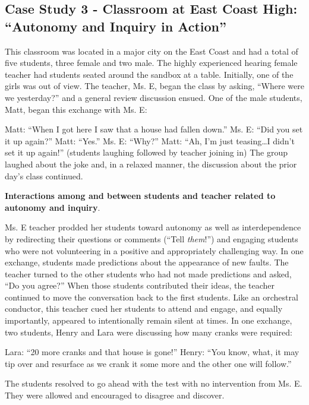 \documentclass[11.5pt]{sig-alternate} %
\begin{document}
\begin{large}
\subsection*{Case Study 3 - Classroom at East Coast High: “Autonomy and Inquiry in Action”}

This classroom was located in a major city on the East Coast and had a total of five students, three female and two male. The highly experienced hearing female teacher had students seated around the sandbox at a table.  Initially, one of the girls was out of view.  The teacher, Ms. E, began the class by asking, “Where were we yesterday?” and a general review discussion ensued.  One of the male students, Matt, began this exchange with Ms. E:

Matt: “When I got here I saw that a house had fallen down.” 
Ms. E: “Did you set it up again?” 
Matt: “Yes.”
Ms. E: “Why?”
Matt: “Ah, I’m just teasing…I didn’t set it up again!” (students laughing followed by teacher joining in)
The group laughed about the joke and, in a relaxed manner, the discussion about the prior day’s class continued. 

\textbf{Interactions among and between students and teacher related to autonomy and inquiry}.

Ms. E teacher prodded her students toward autonomy as well as interdependence by redirecting their questions or comments (“Tell \textit{them}!”) and engaging students who were not volunteering in a positive and appropriately challenging way.  In one exchange, students made predictions about the appearance of new faults. The teacher turned to the other students who had not made predictions and asked, “Do you agree?” When those students contributed their ideas, the teacher continued to move the conversation back to the first students.  Like an orchestral conductor, this teacher cued her students to attend and engage, and equally importantly, appeared to intentionally remain silent at times.  In one exchange, two students, Henry and Lara were discussing how many cranks were required:

Lara: “20 more cranks and that house is gone!”
Henry: “You know, what, it may tip over and resurface as we crank it some more and the other one will follow.”

The students resolved to go ahead with the test with no intervention from Ms. E.  They were allowed and encouraged to disagree and discover.  


\end{large}
\end{document}
